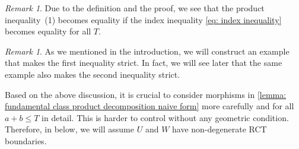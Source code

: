 \documentclass[11pt]{amsart}
\numberwithin{equation}{section}
\theoremstyle{plain}
\theoremstyle{definition}
\theoremstyle{remark}
\newtheorem{RMK}[rmk]{Remark}
\begin{document}
\begin{RMK}\label{remark: index equality iff capacity formula}Due to the definition and the proof, we see that the product inequality~(1) becomes equality if the index inequality \autoref{eq: index inequality} becomes equality for all $T$.  
\end{RMK}

 



\begin{RMK}As we mentioned in the introduction, we will construct an example that makes the first inequality strict. In fact, we will see later that the same example also makes the second inequality strict.
\end{RMK}





Based on the above discussion, it is crucial to consider morphisms in \autoref{lemma: fundamental class product decomposition naive form} more carefully and for all $a+b\leq T$ in detail. This is harder to control without any geometric condition. Therefore, in below, we will assume $U$ and $W$ have non-degenerate RCT boundaries.
\end{document}
